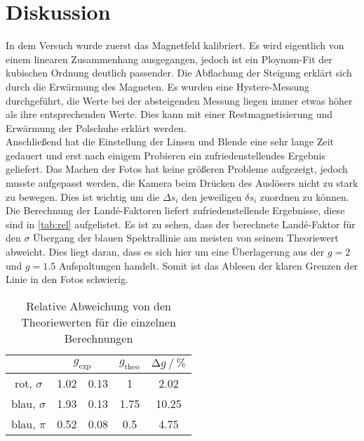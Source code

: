 \newpage
\section{Diskussion}

\noindent In dem Versuch wurde zuerst das Magnetfeld kalibriert. Es wird eigentlich von einem linearen Zusammenhang ausgegangen, jedoch ist ein 
Ploynom-Fit der kubischen Ordnung deutlich passender. Die Abflachung der Steigung erklärt sich durch die Erwärmung des Magneten. Es wurden eine 
Hystere-Messung durchgeführt, die Werte bei der absteigenden Messung liegen immer etwas höher als ihre entsprechenden Werte. Dies kann mit einer 
Restmagnetisierung und Erwärmung der Polschuhe erklärt werden. \\

\noindent 
Anschließend hat die Einstellung der Linsen und Blende eine sehr lange Zeit gedauert und erst nach einigem Probieren ein zufriedenstellendes Ergebnis 
geliefert. Das Machen der Fotos hat keine größeren Probleme aufgezeigt, jedoch musste aufgepasst werden, die Kamera beim Drücken des Auslösers nicht 
zu stark zu bewegen. Dies ist wichtig um die $\Delta s_i$ den jeweiligen $\delta s_i$ zuordnen zu können. \\

\noindent
Die Berechnung der Land\'{e}-Faktoren liefert zufriedenstellende Ergebnisse, diese sind in \autoref{tab:rel} aufgelistet. Es ist zu sehen, dass 
der berechnete Land\'{e}-Faktor für den $\sigma$ Übergang der blauen Spektrallinie am meisten von seinem Theoriewert abweicht. Dies liegt 
daran, dass es sich hier um eine Überlagerung aus der $g = \num{2}$ und $g = \num{1.5}$ Aufspaltungen handelt. Somit ist das Ablesen der klaren 
Grenzen der Linie in den Fotos schwierig. 


\begin{table}[ht]
    \centering
    \caption{Relative Abweichung von den Theoriewerten für die einzelnen Berechnungen}
    \label{tab:rel}
        \begin{tabular}{c S[table-format=1.2]@{${}\pm{}$}S[table-format=1.2] S[table-format=1.1] S[table-format=2.2]}
        \toprule
        &  & {$g_\text{theo}$} & {$\increment g \mathbin{/} \si{\percent} $} \\
        \midrule
        rot, $\sigma$ & 1.02 & 0.13 & 1 & 2.02\\
        blau, $\sigma$ &  1.93 & 0.13 & 1.75 & 10.25 \\
        blau, $\pi$ & 0.52 & 0.08 & 0.5 & 4.75 \\
        \bottomrule
    \end{tabular}
\end{table} 

